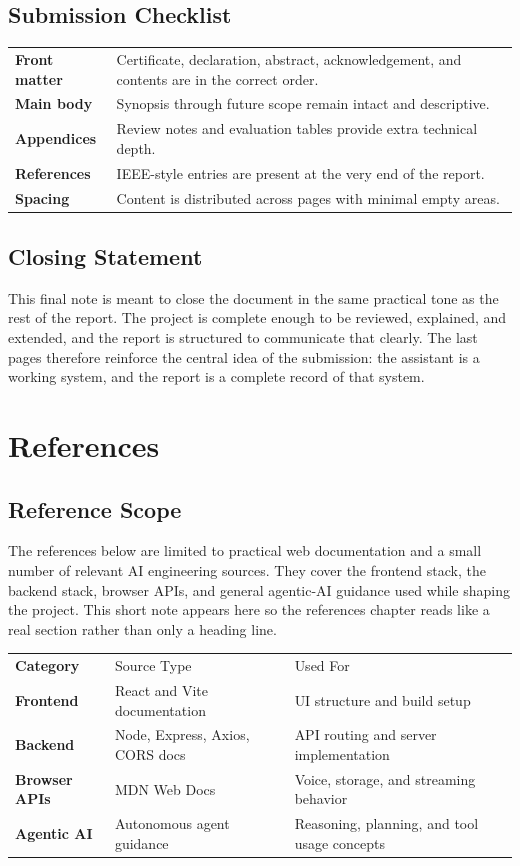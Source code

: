 \documentclass[11pt,oneside]{report}
\begin{document}
\section{Submission Checklist}
\begin{tabularx}{\textwidth}{>{\bfseries}p{}X}
Front matter & Certificate, declaration, abstract, acknowledgement, and contents are in the correct order. \\
Main body & Synopsis through future scope remain intact and descriptive. \\
Appendices & Review notes and evaluation tables provide extra technical depth. \\
References & IEEE-style entries are present at the very end of the report. \\
Spacing & Content is distributed across pages with minimal empty areas. \\
\end{tabularx}

\section{Closing Statement}
This final note is meant to close the document in the same practical tone as the rest of the report. The project is complete enough to be reviewed, explained, and extended, and the report is structured to communicate that clearly. The last pages therefore reinforce the central idea of the submission: the assistant is a working system, and the report is a complete record of that system.

\clearpage
\chapter{References}
\section{Reference Scope}
The references below are limited to practical web documentation and a small number of relevant AI engineering sources. They cover the frontend stack, the backend stack, browser APIs, and general agentic-AI guidance used while shaping the project. This short note appears here so the references chapter reads like a real section rather than only a heading line.

\begin{tabularx}{\textwidth}{>{\bfseries}p{}p{}X}
Category & Source Type & Used For \\
Frontend & React and Vite documentation & UI structure and build setup \\
Backend & Node, Express, Axios, CORS docs & API routing and server implementation \\
Browser APIs & MDN Web Docs & Voice, storage, and streaming behavior \\
Agentic AI & Autonomous agent guidance & Reasoning, planning, and tool usage concepts \\
\end{tabularx}
\end{document}
